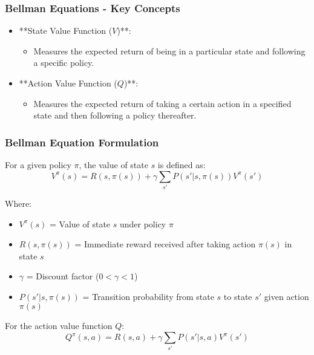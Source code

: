 \documentclass[aspectratio=169]{beamer}
\begin{document}
\begin{frame}[fragile]
  \frametitle{Bellman Equations - Key Concepts}
  \begin{itemize}
    \item **State Value Function ($V$)**: 
      \begin{itemize}
        \item Measures the expected return of being in a particular state and following a specific policy.
      \end{itemize}
    \item **Action Value Function ($Q$)**: 
      \begin{itemize}
        \item Measures the expected return of taking a certain action in a specified state and then following a policy thereafter.
      \end{itemize}
  \end{itemize}
\end{frame}

\begin{frame}[fragile]
  \frametitle{Bellman Equation Formulation}
  For a given policy $\pi$, the value of state $s$ is defined as:
  \begin{equation}
    V^\pi(s) = R(s, \pi(s)) + \gamma \sum_{s'} P(s'|s, \pi(s)) V^\pi(s')
  \end{equation}
  
  Where:
  \begin{itemize}
    \item $V^\pi(s)$ = Value of state $s$ under policy $\pi$
    \item $R(s, \pi(s))$ = Immediate reward received after taking action $\pi(s)$ in state $s$
    \item $\gamma$ = Discount factor ($0 < \gamma < 1$)
    \item $P(s'|s, \pi(s))$ = Transition probability from state $s$ to state $s'$ given action $\pi(s)$
  \end{itemize}

  For the action value function $Q$:
  \begin{equation}
    Q^\pi(s, a) = R(s, a) + \gamma \sum_{s'} P(s'|s, a) V^\pi(s')
  \end{equation}
\end{frame}
\end{document}
